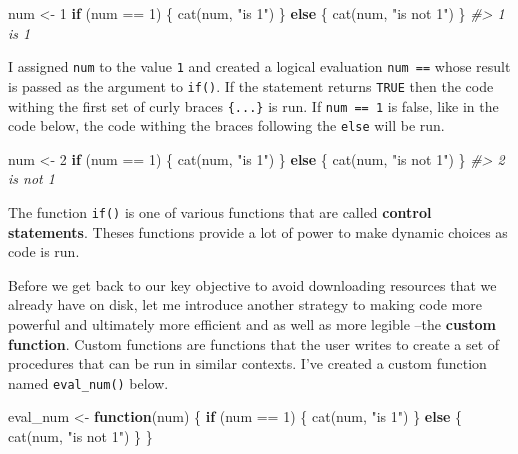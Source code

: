\documentclass[
]{article}
\newenvironment{Shaded}{\begin{snugshade}}{\end{snugshade}}
\newcommand{\CommentTok}[1]{\textcolor[rgb]{0.56,0.35,0.01}{\textit{#1}}}
\newcommand{\ControlFlowTok}[1]{\textcolor[rgb]{0.13,0.29,0.53}{\textbf{#1}}}
\newcommand{\DecValTok}[1]{\textcolor[rgb]{0.00,0.00,0.81}{#1}}
\newcommand{\FunctionTok}[1]{\textcolor[rgb]{0.00,0.00,0.00}{#1}}
\newcommand{\NormalTok}[1]{#1}
\newcommand{\OtherTok}[1]{\textcolor[rgb]{0.56,0.35,0.01}{#1}}
\newcommand{\SpecialCharTok}[1]{\textcolor[rgb]{0.00,0.00,0.00}{#1}}
\newcommand{\StringTok}[1]{\textcolor[rgb]{0.31,0.60,0.02}{#1}}
\begin{document}
\begin{Shaded}
\begin{Highlighting}[]
\NormalTok{num }\OtherTok{\textless{}{-}} \DecValTok{1}
\ControlFlowTok{if}\NormalTok{ (num }\SpecialCharTok{==} \DecValTok{1}\NormalTok{) \{}
    \FunctionTok{cat}\NormalTok{(num, }\StringTok{"is 1"}\NormalTok{)}
\NormalTok{\} }\ControlFlowTok{else}\NormalTok{ \{}
    \FunctionTok{cat}\NormalTok{(num, }\StringTok{"is not 1"}\NormalTok{)}
\NormalTok{\}}
\CommentTok{\#\textgreater{} 1 is 1}
\end{Highlighting}
\end{Shaded}

I assigned \texttt{num} to the value \texttt{1} and created a logical evaluation \texttt{num\ ==} whose result is passed as the argument to \texttt{if()}. If the statement returns \texttt{TRUE} then the code withing the first set of curly braces \texttt{\{...\}} is run. If \texttt{num\ ==\ 1} is false, like in the code below, the code withing the braces following the \texttt{else} will be run.

\begin{Shaded}
\begin{Highlighting}[]
\NormalTok{num }\OtherTok{\textless{}{-}} \DecValTok{2}
\ControlFlowTok{if}\NormalTok{ (num }\SpecialCharTok{==} \DecValTok{1}\NormalTok{) \{}
    \FunctionTok{cat}\NormalTok{(num, }\StringTok{"is 1"}\NormalTok{)}
\NormalTok{\} }\ControlFlowTok{else}\NormalTok{ \{}
    \FunctionTok{cat}\NormalTok{(num, }\StringTok{"is not 1"}\NormalTok{)}
\NormalTok{\}}
\CommentTok{\#\textgreater{} 2 is not 1}
\end{Highlighting}
\end{Shaded}

The function \texttt{if()} is one of various functions that are called \textbf{control statements}. Theses functions provide a lot of power to make dynamic choices as code is run.

Before we get back to our key objective to avoid downloading resources that we already have on disk, let me introduce another strategy to making code more powerful and ultimately more efficient and as well as more legible --the \textbf{custom function}. Custom functions are functions that the user writes to create a set of procedures that can be run in similar contexts. I've created a custom function named \texttt{eval\_num()} below.

\begin{Shaded}
\begin{Highlighting}[]
\NormalTok{eval\_num }\OtherTok{\textless{}{-}} \ControlFlowTok{function}\NormalTok{(num) \{}
    \ControlFlowTok{if}\NormalTok{ (num }\SpecialCharTok{==} \DecValTok{1}\NormalTok{) \{}
        \FunctionTok{cat}\NormalTok{(num, }\StringTok{"is 1"}\NormalTok{)}
\NormalTok{    \} }\ControlFlowTok{else}\NormalTok{ \{}
        \FunctionTok{cat}\NormalTok{(num, }\StringTok{"is not 1"}\NormalTok{)}
\NormalTok{    \}}
\NormalTok{\}}
\end{Highlighting}
\end{Shaded}
\end{document}
